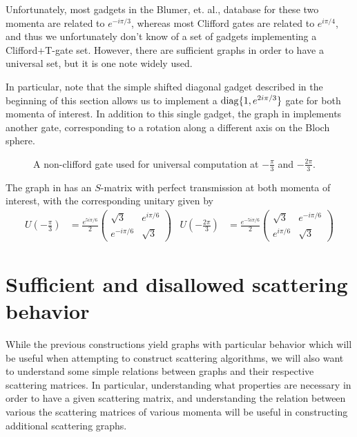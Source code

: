 \documentclass[../thesis-main/thesis-main]{subfiles}
\begin{document}
Unfortunately, most gadgets in the Blumer, et. al., database for these two momenta are related to $e^{-i \pi/3}$, whereas most Clifford gates are related to $e^{i \pi/4}$, and thus we unfortunately don't know of a set of gadgets implementing a Clifford+T-gate set.  However, there are sufficient graphs in order to have a universal set, but it is one note widely used.

In particular, note that the simple shifted diagonal gadget described in the beginning of this section allows us to implement a $\operatorname{diag}\{1,e^{2i \pi/3}\}$ gate for both momenta of interest.  In addition to this single gadget, the graph in  implements another gate, corresponding to a rotation along a different axis on the Bloch sphere.  

\begin{figure}
  \centering
  
  \caption[Non-clifford gadget at $\frac{\pi}{3}$ and $\frac{2\pi}{3}$]{A non-clifford gate used for universal computation at $-\frac{\pi}{3}$ and $-\frac{2\pi}{3}$.}
  \label{fig:pi_3_universal}
\end{figure}

The graph in  has an $S$-matrix with perfect transmission at both momenta of interest, with the corresponding unitary given by
\begin{align}
  U(-\frac{\pi}{3}) &= \frac{e^{5i \pi/6}}{2} \begin{pmatrix}
    \sqrt{3} & e^{ i \pi/6}\\
    e^{- i \pi/6} & \sqrt{3}
  \end{pmatrix} &
  U(-\frac{2\pi}{3}) &=  \frac{e^{-5i \pi/6}}{2} \begin{pmatrix}
    \sqrt{3} & e^{- i \pi/6}\\
    e^{ i \pi/6} & \sqrt{3}
  \end{pmatrix}
\end{align}



\section{Sufficient and disallowed scattering behavior}

While the previous constructions yield graphs with particular behavior which will be useful when attempting to construct scattering algorithms, we will also want to understand some simple relations between graphs and their respective scattering matrices.  In particular, understanding what properties are necessary in order to have a given scattering matrix, and understanding the relation between various the scattering matrices of various momenta will be useful in constructing additional scattering graphs.
\end{document}
